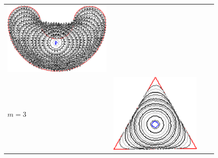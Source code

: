 {\begin{figure}
\begin{tabular}{p{3em}ccc}
\includegraphics[scale=0.25]{figures/chapter6/level-effect/bean/improve/len_pen0/radius-5/level1/summary.pdf} \\[2em]
$m=3$ & \includegraphics[scale=0.25]{figures/chapter6/level-effect/triangle/improve/len_pen0/radius-5/level3/summary.pdf} &

\end{tabular}
\end{figure}}
